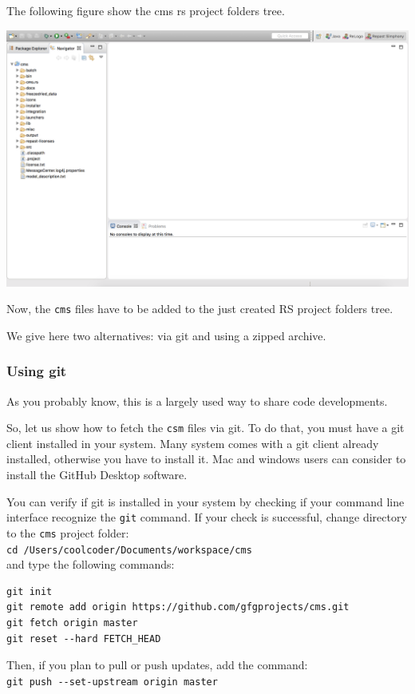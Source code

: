 \documentclass{article}
\begin{document}
The following figure show the cms rs project folders tree.

\vskip2mm
\noindent
\includegraphics[scale=0.35]{fig_cms_rs_navigation}

\vskip2mm
Now, the \verb+cms+ files have to be added to the just created RS project folders tree.

We give here two alternatives: via git and using a zipped archive.

\subsubsection{Using git}

As you probably know, this is a largely used way to share code developments.

So, let us show how to fetch the \verb+csm+ files via git. To do that, you must have a git client installed in your system. Many system comes with a git client already installed, otherwise you have to install it. Mac and windows users can consider to install the GitHub Desktop software.

You can verify if git is installed in your system by checking if your command line interface recognize the \verb+git+ command.  
If your check is successful, change directory to the \verb+cms+ project folder:\\
\verb+cd /Users/coolcoder/Documents/workspace/cms+\\
and type the following commands:
\begin{verbatim}
git init
git remote add origin https://github.com/gfgprojects/cms.git
git fetch origin master
git reset --hard FETCH_HEAD
\end{verbatim}

Then, if you plan to pull or push updates, add the command:\\
\verb+git push --set-upstream origin master+
\end{document}
